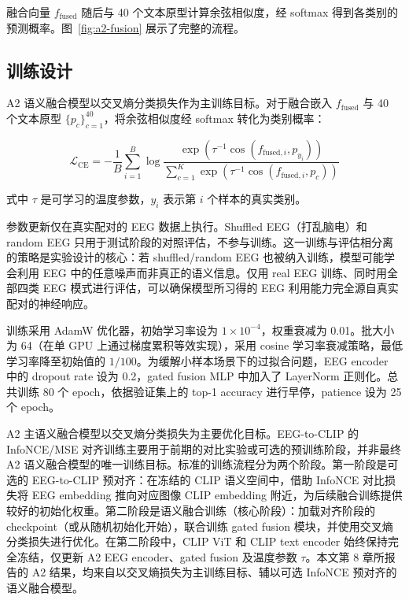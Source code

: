 融合向量 $f_{\mathrm{fused}}$ 随后与 40 个文本原型计算余弦相似度，经 softmax 得到各类别的预测概率。图~\ref{fig:a2-fusion} 展示了完整的流程。


\subsection{训练设计}

A2 语义融合模型以交叉熵分类损失作为主训练目标。对于融合嵌入 $f_{\mathrm{fused}}$ 与 40 个文本原型 $\{p_c\}_{c=1}^{40}$，将余弦相似度经 softmax 转化为类别概率：

\begin{equation}
  \mathcal{L}_{\mathrm{CE}} = -\frac{1}{B} \sum_{i=1}^{B} \log \frac{\exp(\tau^{-1} \cos(f_{\mathrm{fused},i}, p_{y_i}))}{\sum_{c=1}^{K} \exp(\tau^{-1} \cos(f_{\mathrm{fused},i}, p_c))}
\end{equation}

式中 $\tau$ 是可学习的温度参数，$y_i$ 表示第 $i$ 个样本的真实类别。

参数更新仅在真实配对的 EEG 数据上执行。Shuffled EEG（打乱脑电）和 random EEG 只用于测试阶段的对照评估，不参与训练。这一训练与评估相分离的策略是实验设计的核心：若 shuffled/random EEG 也被纳入训练，模型可能学会利用 EEG 中的任意噪声而非真正的语义信息。仅用 real EEG 训练、同时用全部四类 EEG 模式进行评估，可以确保模型所习得的 EEG 利用能力完全源自真实配对的神经响应。

训练采用 AdamW 优化器，初始学习率设为 $1\times10^{-4}$，权重衰减为 0.01。批大小为 64（在单 GPU 上通过梯度累积等效实现），采用 cosine 学习率衰减策略，最低学习率降至初始值的 $1/100$。为缓解小样本场景下的过拟合问题，EEG encoder 中的 dropout rate 设为 0.2，gated fusion MLP 中加入了 LayerNorm 正则化。总共训练 80 个 epoch，依据验证集上的 top-1 accuracy 进行早停，patience 设为 25 个 epoch。

A2 主语义融合模型以交叉熵分类损失为主要优化目标。EEG-to-CLIP 的 InfoNCE/MSE 对齐训练主要用于前期的对比实验或可选的预训练阶段，并非最终 A2 语义融合模型的唯一训练目标。标准的训练流程分为两个阶段。第一阶段是可选的 EEG-to-CLIP 预对齐：在冻结的 CLIP 语义空间中，借助 InfoNCE 对比损失将 EEG embedding 推向对应图像 CLIP embedding 附近，为后续融合训练提供较好的初始化权重。第二阶段是语义融合训练（核心阶段）：加载对齐阶段的 checkpoint（或从随机初始化开始），联合训练 gated fusion 模块，并使用交叉熵分类损失进行优化。在第二阶段中，CLIP ViT 和 CLIP text encoder 始终保持完全冻结，仅更新 A2 EEG encoder、gated fusion 及温度参数 $\tau$。本文第 8 章所报告的 A2 结果，均来自以交叉熵损失为主训练目标、辅以可选 InfoNCE 预对齐的语义融合模型。


